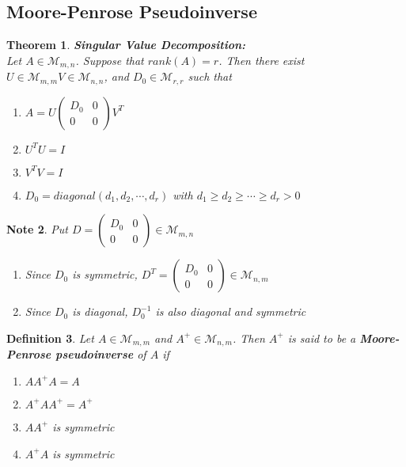 \documentclass[12pt]{amsart}
\newtheorem{thm}{Theorem}[section]
\newtheorem{defn}[thm]{Definition}
\newtheorem{note}[thm]{Note}
\newcommand{\MM}{\mathcal{M}}
\begin{document}
\subsection{Moore-Penrose Pseudoinverse}

\begin{thm} \textbf{Singular Value Decomposition:} \\
Let $A \in \MM_{m,n}$. Suppose that $rank(A) = r$. Then there exist $U \in \MM_{m,m} V \in \MM_{n,n}$, and $D_0 \in \MM_{r,r}$ such that
\begin{enumerate}
\item $A = 
U
\begin{pmatrix}
D_0 & 0 \\
0 & 0
\end{pmatrix}
V^T
$
\item  
$U^T
U = I$
\item $V^T
V = I$ 
\item $D_0 = diagonal(d_1, d_2, \cdots, d_r)$ with $d_1 \geq d_2 \geq \cdots \geq d_r >0$
\end{enumerate}

\end{thm}

\begin{note}
Put $D = 
\begin{pmatrix}
D_0 & 0 \\
0 & 0
\end{pmatrix} \in \MM_{m,n}$ 
\begin{enumerate}
\item Since $D_0$ is symmetric, $D^T = 
\begin{pmatrix}
D_0 & 0 \\
0 & 0
\end{pmatrix}  \in \MM_{n,m}$
\item Since $D_0$ is diagonal, $D_0^{-1}$ is also diagonal and symmetric
\end{enumerate}
\end{note}

\begin{defn}
Let $A \in \MM_{m,m}$ and $A^+ \in \MM_{n,m}$. Then $A^+$ is said to be a  \textbf{Moore-Penrose pseudoinverse} of $A$ if 
\begin{enumerate}
\item $AA^+A = A$
\item $A^+AA^+ = A^+$
\item $AA^+$ is symmetric
\item $A^+A$ is symmetric
\end{enumerate} 
\end{defn}
\end{document}
